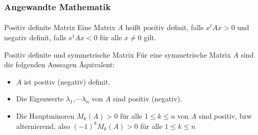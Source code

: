 \documentclass{beamer}
\begin{document}
\begin{frame}
    \frametitle{Angewandte Mathematik}
\framesubtitle{}
    \begin{block}{Positiv definite  Matrix}
Eine Matrix $A$ heißt positiv definit, falls $x^t Ax > 0$ und negativ definit, falls  $x^t Ax < 0$ für alle $x \neq 0$ gilt.
\end{block}

    \begin{block}{Positiv definite und symmetrische  Matrix}
Für eine symmetrische Matrix $A$ sind die folgenden Aussagen Äquivalent:
\begin{itemize}
\item $A$ ist positiv  (negativ) definit.
\item Die Eigenwerte $\lambda_1, \cdots \lambda_n$ von $A$ sind positiv (negativ).
\item Die Hauptminoren $M_k(A) > 0$ für alle $1 \leq k \leq n$ von $A$ sind positiv, bzw  alternierend, also $(-1)^k M_k(A) > 0$ für alle $1 \leq k \leq n$ 
\end{itemize}

\end{block}



 \end{frame}
\end{document}
